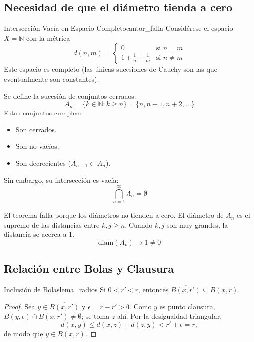\documentclass[11pt, a4paper]{article}
\begin{document}
\subsection{Necesidad de que el diámetro tienda a cero}

\begin{ejemplo}{Intersección Vacía en Espacio Completo}{cantor_falla}
Considérese el espacio $X = \mathbb{N}$ con la métrica
$$ d(n, m) = \begin{cases} 0 & \text{si } n=m \\ 1 + \frac{1}{n} + \frac{1}{m} & \text{si } n \neq m
\end{cases} $$
Este espacio es completo (las únicas sucesiones de Cauchy son las que eventualmente son constantes).

Se define la sucesión de conjuntos cerrados:
$$ A_n = \{ k \in \mathbb{N} : k \ge n \} = \{ n, n+1, n+2, \dots \} $$
Estos conjuntos cumplen:
\begin{itemize}
    \item Son cerrados.
    \item Son no vacíos.
    \item Son decrecientes ($A_{n+1} \subset A_n$).
\end{itemize}
Sin embargo, su intersección es vacía:
$$ \bigcap_{n=1}^{\infty} A_n = \emptyset $$

El teorema falla porque los diámetros no tienden a cero.
El diámetro de $A_n$ es el supremo de las distancias entre $k, j \ge n$. Cuando $k, j$ son muy
grandes, la distancia se acerca a 1.
$$ \text{diam}(A_n) \to 1 \neq 0 $$
\end{ejemplo}

\subsection{Relación entre Bolas y Clausura}

\begin{proposicion}{Inclusión de Bolas}{lema_radios}
Si $0 < r' < r$, entonces $\overline{B(x, r')} \subseteq B(x, r)$.
\end{proposicion}

\begin{proof}
Sea $y \in \overline{B(x, r')}$ y $\epsilon = r - r' > 0$. Como $y$ es punto clausura,
$B(y, \epsilon) \cap B(x, r') \ne \emptyset$; se toma $z$ ahí. Por la desigualdad triangular,
$$ d(x, y) \le d(x, z) + d(z, y) < r' + \epsilon = r, $$
de modo que $y \in B(x, r)$.
\end{proof}
\end{document}
